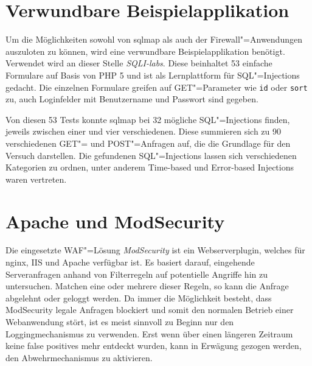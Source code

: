 \section{Verwundbare Beispielapplikation}

Um die Möglichkeiten sowohl von sqlmap als auch der Firewall"=Anwendungen auszuloten zu können, wird eine verwundbare Beispielapplikation benötigt. Verwendet wird an dieser Stelle \emph{SQLI-labs}. Diese beinhaltet 53 einfache Formulare auf Basis von PHP 5 und ist als Lernplattform für SQL"=Injections gedacht. Die einzelnen Formulare greifen auf GET"=Parameter wie \texttt{id} oder \texttt{sort} zu, auch Loginfelder mit Benutzername und Passwort sind gegeben.

Von diesen 53 Tests konnte sqlmap bei 32 mögliche SQL"=Injections finden, jeweils zwischen einer und vier verschiedenen. Diese summieren sich zu 90 verschiedenen GET"= und POST"=Anfragen auf, die die Grundlage für den Versuch darstellen. Die gefundenen SQL"=Injections lassen sich verschiedenen Kategorien zu ordnen, unter anderem Time-based und Error-based Injections waren vertreten.

\section{Apache und ModSecurity}
\label{sec:modsecurity}

Die eingesetzte WAF"=Lösung \emph{ModSecurity} ist ein Webserverplugin, welches für nginx, IIS und Apache verfügbar ist. Es basiert darauf, eingehende Serveranfragen anhand von Filterregeln auf potentielle Angriffe hin zu untersuchen. Matchen eine oder mehrere dieser Regeln, so kann die Anfrage abgelehnt oder geloggt werden. Da immer die Möglichkeit besteht, dass ModSecurity legale Anfragen blockiert und somit den normalen Betrieb einer Webanwendung stört, ist es meist sinnvoll zu Beginn nur den Loggingmechanismus zu verwenden. Erst wenn über einen längeren Zeitraum keine false positives mehr entdeckt wurden, kann in Erwägung gezogen werden, den Abwehrmechanismus zu aktivieren.


